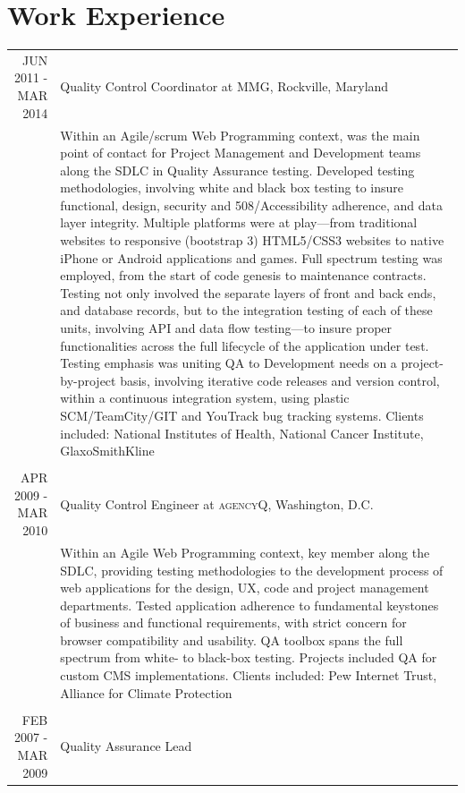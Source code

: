 \documentclass[a4paper,10pt]{article}
\begin{document}
\section{Work Experience}
\begin{tabular}{r|p{11cm}}
 \textsc{JUN 2011 - MAR 2014} & Quality Control Coordinator
 at \textsc{MMG}, Rockville, Maryland \\&\footnotesize{Within an Agile/scrum Web Programming context, was the main point of contact for Project Management and Development teams along the SDLC in Quality Assurance testing. Developed testing methodologies, involving white and black box testing to insure functional, design, security and 508/Accessibility adherence, and data layer integrity. Multiple platforms were at play—from traditional websites to responsive (bootstrap 3) HTML5/CSS3 websites to native iPhone or Android applications and games. Full spectrum testing was employed, from the start of code genesis to maintenance contracts. Testing not only involved the separate layers of front and back ends, and database records, but to the integration testing of each of these units, involving API and data flow testing—to insure proper functionalities across the full lifecycle of the application under test. Testing emphasis 
was uniting QA to Development needs on a project-by-project basis, involving iterative code releases and version control, within a 
continuous integration system, using plastic SCM/TeamCity/GIT and YouTrack bug tracking systems.
Clients included: National Institutes of Health, National Cancer Institute, 
GlaxoSmithKline}\\\multicolumn{2}{c}{} \\
\textsc{APR 2009 - MAR 2010} & Quality Control Engineer
at \textsc{agencyQ}, Washington, D.C.\\&\footnotesize{Within an Agile Web Programming context, key member along the SDLC, providing testing methodologies to the development process of web applications for the design, UX, code and project management departments. Tested application adherence to fundamental keystones of business and functional requirements, with strict concern for browser compatibility and usability.  QA toolbox spans the full spectrum from white- to black-box testing. Projects included QA for custom CMS implementations.
Clients included: Pew Internet Trust, Alliance for Climate Protection}\\\multicolumn{2}{c}{} \\
\textsc{FEB 2007 - MAR 2009} & Quality Assurance Lead

\end{tabular}
\end{document}
